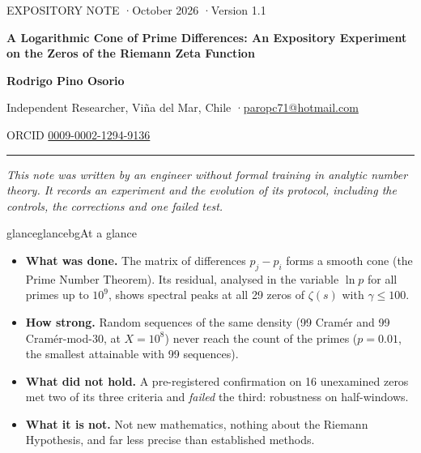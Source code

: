\documentclass[11pt,a4paper]{article}
\begin{document}
\thispagestyle{empty}
\vspace*{-4mm}
{\sffamily\small\color{muted} EXPOSITORY NOTE \quad·\quad October 2026 \quad·\quad Version 1.1\par}
\vspace{7mm}
{\sffamily\bfseries\fontsize{21}{26}\selectfont\color{ink}
A Logarithmic Cone of Prime Differences: An Expository Experiment on the Zeros of the Riemann Zeta Function\par}
\vspace{6mm}
{\sffamily\bfseries\normalsize Rodrigo Pino Osorio\par}
\vspace{1mm}
{\sffamily\small\color{muted} Independent Researcher, Viña del Mar, Chile \quad·\quad \href{mailto:paropc71@hotmail.com}{paropc71@hotmail.com}\par}
{\sffamily\small\color{muted} ORCID \href{https://orcid.org/0009-0002-1294-9136}{0009-0002-1294-9136}\par}
\vspace{5mm}
{\color{muted!40}\hrule}
\vspace{5mm}

{\small\itshape This note was written by an engineer without formal training in analytic number theory. It records an experiment and the evolution of its protocol, including the controls, the corrections and one failed test.\par}
\vspace{2mm}

\begin{notebox}{glance}{glancebg}{At a glance}
\begin{itemize}[leftmargin=1.1em,itemsep=0.35em,topsep=0pt]
\item \textbf{What was done.} The matrix of differences $p_j-p_i$ forms a smooth cone (the Prime Number Theorem). Its residual, analysed in the variable $\ln p$ for all primes up to $10^9$, shows spectral peaks at all 29 zeros of $\zeta(s)$ with $\gamma\le 100$.
\item \textbf{How strong.} Random sequences of the same density (99 Cramér and 99 Cramér-mod-30, at $X=10^8$) never reach the count of the primes ($p=0.01$, the smallest attainable with 99 sequences).
\item \textbf{What did not hold.} A pre-registered confirmation on 16 unexamined zeros met two of its three criteria and \emph{failed} the third: robustness on half-windows.
\item \textbf{What it is not.} Not new mathematics, nothing about the Riemann Hypothesis, and far less precise than established methods.
\end{itemize}
\end{notebox}
\end{document}
